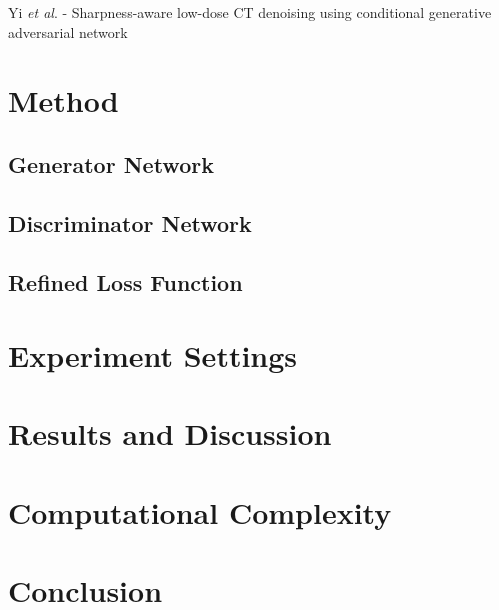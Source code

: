 \documentclass[journal]{IEEEtran}
\begin{document}
\cite{yi2018sharpness} Yi \emph{et al}. - Sharpness-aware low-dose CT denoising using conditional generative adversarial network

\section{Method}
\label{Method}



\subsection{Generator Network}
\label{generator}


\subsection{Discriminator Network}
\label{discriminator}


\subsection{Refined Loss Function}
\label{loss function}


\section{Experiment Settings}
\label{experiment settings}

\section{Results and Discussion}
\label{results and discussion}

\section{Computational Complexity}
\label{complexity}

\section{Conclusion}
\label{Conclusion}



\end{document}
